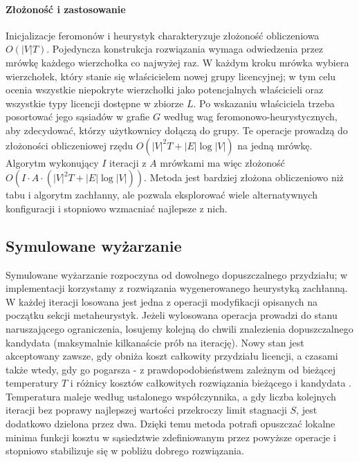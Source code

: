 \paragraph{Złożoność i zastosowanie}
Inicjalizacje feromonów i heurystyk charakteryzuje złożoność obliczeniowa $O(|V|T)$. Pojedyncza konstrukcja rozwiązania wymaga odwiedzenia przez mrówkę każdego wierzchołka co najwyżej raz. W każdym kroku mrówka wybiera wierzchołek, który stanie się właścicielem nowej grupy licencyjnej; w tym celu ocenia wszystkie niepokryte wierzchołki jako potencjalnych właścicieli oraz wszystkie typy licencji dostępne w zbiorze $L$. Po wskazaniu właściciela trzeba posortować jego sąsiadów w grafie $G$ według wag feromonowo-heurystycznych, aby zdecydować, którzy użytkownicy dołączą do grupy. Te operacje prowadzą do złożoności obliczeniowej rzędu $O(|V|^2 T + |E|\log |V|)$ na jedną mrówkę. Algorytm wykonujący $I$ iteracji z $A$ mrówkami ma więc złożoność $O\!\left(I \cdot A \cdot (|V|^2 T + |E|\log |V|)\right)$. Metoda jest bardziej złożona obliczeniowo niż tabu i algorytm zachłanny, ale pozwala eksplorować wiele alternatywnych konfiguracji i stopniowo wzmacniać najlepsze z nich.


\subsection{Symulowane wyżarzanie }\label{subsec:sa}
Symulowane wyżarzanie rozpoczyna od dowolnego dopuszczalnego przydziału; w implementacji korzystamy z rozwiązania wygenerowanego heurystyką zachłanną. W każdej iteracji losowana jest jedna z operacji modyfikacji opisanych na początku sekcji metaheurystyk. Jeżeli wylosowana operacja prowadzi do stanu naruszającego ograniczenia, losujemy kolejną do chwili znalezienia dopuszczalnego kandydata (maksymalnie kilkanaście prób na iterację). Nowy stan jest akceptowany zawsze, gdy obniża koszt całkowity przydziału licencji, a czasami także wtedy, gdy go pogarsza - z prawdopodobieństwem zależnym od bieżącej temperatury \(T\) i różnicy kosztów całkowitych rozwiązania bieżącego i kandydata \cite{kirkpatrick1983}. Temperatura maleje według ustalonego współczynnika, a gdy liczba kolejnych iteracji bez poprawy najlepszej wartości przekroczy limit stagnacji \(S\), jest dodatkowo dzielona przez dwa. Dzięki temu metoda potrafi opuszczać lokalne minima funkcji kosztu w sąsiedztwie zdefiniowanym przez powyższe operacje i stopniowo stabilizuje się w pobliżu dobrego rozwiązania.


